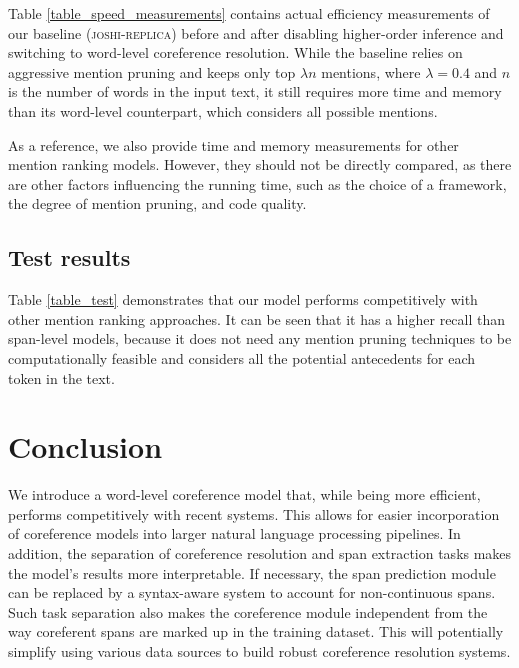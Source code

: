 \documentclass[11pt]{article}
\begin{document}
Table \ref{table_speed_measurements} contains actual efficiency measurements of our baseline (\textsc{joshi-replica}) before and after disabling higher-order inference and switching to word-level coreference resolution. While the baseline relies on aggressive mention pruning and keeps only top $\lambda n$ mentions, where $\lambda = 0.4$ and $n$ is the number of words in the input text, it still requires more time and memory than its word-level counterpart, which considers all possible mentions.

As a reference, we also provide time and memory measurements for other mention ranking models. However, they should not be directly compared, as there are other factors influencing the running time, such as the choice of a framework, the degree of mention pruning, and code quality.

\subsection{Test results} Table \ref{table_test} demonstrates that our model performs competitively with other mention ranking approaches. It can be seen that it has a higher recall than span-level models, because it does not need any mention pruning techniques to be computationally feasible and considers all the potential antecedents for each token in the text.

\section{Conclusion}
We introduce a word-level coreference model that, while being more efficient, performs competitively with recent systems. This allows for easier incorporation of coreference models into larger natural language processing pipelines. In addition, the separation of coreference resolution and span extraction tasks makes the model's results more interpretable.
If necessary, the span prediction module can be replaced by a syntax-aware system to account for non-continuous spans.
Such task separation also makes the coreference module independent from the way coreferent spans are marked up in the training dataset. This will potentially simplify using various data sources to build robust coreference resolution systems.



\end{document}

